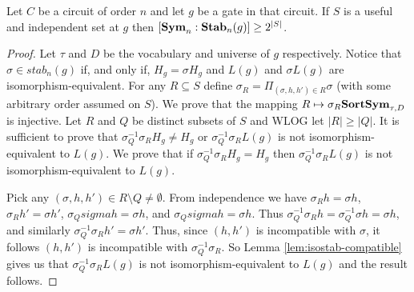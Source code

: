 \documentclass[../paper.tex]{subfiles}
\begin{document}
\begin{lem}
\label{lem:useful-independant-set}
  Let $C$ be a circuit of order $n$ and let $g$ be a gate in that circuit. If
  $S$ is a useful and independent set at $g$ then $[\text{\textbf{Sym}}_n : \text{\textbf{Stab}}_n(g)] \geq
  2^{\vert S \vert}$.
\end{lem}
\begin{proof}
  Let $\tau$ and $D$ be the vocabulary and universe of $g$ respectively. Notice
  that $\sigma \in stab_n(g)$ if, and only if, $H_g = \sigma H_g$ and $L(g)$ and
  $\sigma L(g)$ are isomorphism-equivalent. For any $R \subseteq S$ define
  $\sigma_R = \Pi_{(\sigma, h, h') \in R} \sigma$ (with some arbitrary order
  assumed on $S$). We prove that the mapping $R \mapsto \sigma_R \text{\textbf{SortSym}}_{\tau,D}$ is
  injective. Let $R$ and $Q$ be distinct subsets of $S$ and WLOG let $\vert R
  \vert \geq \vert Q \vert$. It is sufficient to prove that $\sigma^{-1}_Q
  \sigma_R H_g \neq H_g$ or $\sigma^{-1}_Q \sigma_R L(g)$ is not
  isomorphism-equivalent to $L(g)$. We prove that if $\sigma^{-1}_Q \sigma_R H_g
  = H_g$ then $\sigma^{-1}_Q \sigma_R L(g)$ is not isomorphism-equivalent to
  $L(g)$.

  Pick any $(\sigma, h, h') \in R \setminus Q \neq \emptyset$. From independence
  we have $\sigma_R h = \sigma h$, $\sigma_R h' = \sigma h'$, $\sigma_Q sigma h
  = \sigma h $, and $\sigma_Q sigma h = \sigma h$. Thus $\sigma^{-1}_Q \sigma_R
  h = \sigma^{-1}_Q \sigma h = \sigma h$, and similarly $\sigma^{-1}_Q\sigma_R
  h' = \sigma h'$. Thus, since $(h, h')$ is incompatible with $\sigma$, it
  follows $(h, h')$ is incompatible with $\sigma^{-1}_Q\sigma_R$. So Lemma
  \ref{lem:isostab-compatible} gives us that $\sigma^{-1}_Q \sigma_R L(g)$ is
  not isomorphism-equivalent to $L(g)$ and the result follows.
\end{proof}




%



\end{document}
